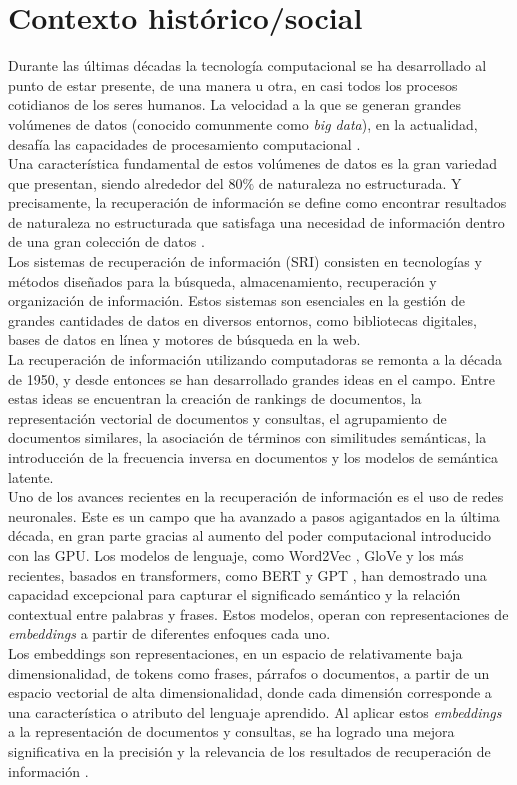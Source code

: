 \section{Contexto histórico/social} 
Durante las últimas décadas la tecnología computacional se ha desarrollado al punto de estar presente, de una manera u otra, en casi todos los procesos cotidianos de los seres humanos. La velocidad a la que se generan grandes volúmenes de datos (conocido comunmente como \textit{big data}), en la actualidad, desafía las capacidades de procesamiento computacional \cite{RiseofBigData}.\\
Una característica fundamental de estos volúmenes de datos es la gran variedad que presentan, siendo alrededor del 80$\%$ de naturaleza no estructurada. Y precisamente, la recuperación de información se define como encontrar resultados de naturaleza no estructurada que satisfaga una necesidad de información dentro de una gran colección de datos \cite{manning2008introductiontoIR}.\\
Los sistemas de recuperación de información (SRI) consisten en tecnologías y métodos diseñados para la búsqueda, almacenamiento, recuperación y organización de información. Estos sistemas son esenciales en la gestión de grandes cantidades de datos en diversos entornos, como bibliotecas digitales, bases de datos en línea y motores de búsqueda en la web.\\ 
La recuperación de información utilizando computadoras  se remonta a la década de 1950, y desde entonces se han desarrollado grandes ideas en el campo. Entre estas ideas se encuentran la creación de rankings de documentos, la representación vectorial de documentos y consultas, el agrupamiento de documentos similares, la asociación de términos con similitudes semánticas, la introducción de la frecuencia inversa en documentos y los modelos de semántica latente.\cite{SRIConf1}\\
Uno de los avances recientes en la recuperación de información es el uso de redes neuronales. Este es un campo que ha avanzado a pasos agigantados en la última década, en gran parte gracias al aumento del poder computacional introducido con las GPU. Los modelos de lenguaje, como Word2Vec \cite{Mikolov2013EfficientEO}, GloVe \cite{Pennington2014GloVeGV} y los más recientes, basados en transformers, como BERT \cite{Devlin2019BERTPO} y GPT \cite{Radford2018ImprovingLU}, han demostrado una capacidad excepcional para capturar el significado semántico y la relación contextual entre palabras y frases. Estos modelos, operan con representaciones de \textit{embeddings} a partir de diferentes enfoques cada uno.\\
Los embeddings son representaciones, en un espacio de relativamente baja dimensionalidad, de tokens como frases, párrafos o documentos, a partir de un espacio vectorial de alta dimensionalidad, donde cada dimensión corresponde a una característica o atributo del lenguaje aprendido. Al aplicar estos \textit{embeddings} a la representación de documentos y consultas, se ha logrado una mejora significativa en la precisión y la relevancia de los resultados de recuperación de información \cite{docEmbReview}.\\ 
